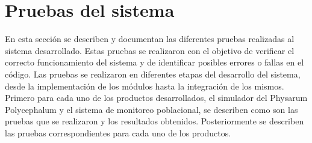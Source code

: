 \section{Pruebas del sistema}
\label{sec:Pruebas del sistema}
    En esta secci\'on se describen y documentan las diferentes pruebas realizadas al sistema desarrollado. 
        Estas pruebas se realizaron con el objetivo de verificar el correcto funcionamiento del sistema y 
        de identificar posibles errores o fallas en el c\'odigo. Las pruebas se realizaron en diferentes 
        etapas del desarrollo del sistema, desde la implementaci\'on de los m\'odulos hasta la integraci\'on 
        de los mismos. Primero para cada uno de los productos desarrollados, el simulador del Physarum
        Polycephalum y el sistema de monitoreo poblacional, se describen como son las pruebas que se realizaron
        y los resultados obtenidos. Posteriormente se describen las pruebas correspondientes para cada uno de los productos.
    